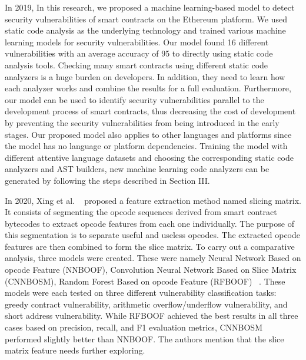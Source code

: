 In 2019, In this research, we proposed a machine learning-based
model to detect security vulnerabilities of smart contracts
on the Ethereum platform. We used static code analysis as
the underlying technology and trained various machine
learning models for security vulnerabilities. Our
model found 16 different vulnerabilities with an
average accuracy of 95%
to directly using static code analysis tools. Checking many smart contracts using different static code analyzers
is a huge burden on developers. In addition, they need to learn
how each analyzer works and combine the results for a full
evaluation. Furthermore, our model can be used to identify
security vulnerabilities parallel to the development process
of smart contracts, thus decreasing the cost of development
by preventing the security vulnerabilities from being introduced
in the early stages. Our proposed model also applies to
other languages and platforms since the model has no language
or platform dependencies. Training the model
with different attentive language datasets and choosing
the corresponding static code analyzers and AST builders,
new machine learning code analyzers can be generated by
following the steps described in Section III.

In 2020, Xing et al. ~\cite{xing2020new} proposed a feature extraction method named slicing matrix.
It consists of segmenting the opcode sequences derived from
smart contract bytecodes to extract opcode features from each one individually.
The purpose of this segmentation is to separate useful and useless opcodes.
The extracted opcode features are then combined to form the slice matrix.
To carry out a comparative analysis, three models were created.
These were namely Neural Network Based on opcode Feature (NNBOOF), Convolution Neural Network Based on Slice Matrix (CNNBOSM), Random Forest Based on opcode Feature
(RFBOOF) ~\cite{hu2021comprehensive}.
These models were each tested on three different vulnerability classification tasks: greedy contract vulnerability, arithmetic overflow/underflow vulnerability, and short address vulnerability.
While RFBOOF achieved the best results in all three cases based on precision, recall, and F1 evaluation metrics, CNNBOSM performed slightly better than NNBOOF.
The authors mention that the slice matrix feature needs further exploring.

